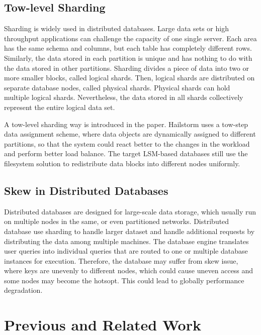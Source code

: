 \documentclass[a4paper,10pt,twoside]{article}
\begin{document}
\subsection{Tow-level Sharding}
Sharding is widely used in distributed databases. Large data sets or high throughput applications can challenge the capacity of one single server.
Each area has the same schema and columns, but each table has completely different rows. 
Similarly, the data stored in each partition is unique and has nothing to do with the data stored in other partitions.
Sharding divides a piece of data into two or more smaller blocks, called logical shards.
Then, logical shards are distributed on separate database nodes, called physical shards.
Physical shards can hold multiple logical shards. 
Nevertheless, the data stored in all shards collectively represent the entire logical data set.
\par
A tow-level sharding way is introduced in the paper\cite{mainpaper}. 
Hailstorm uses a tow-step data assignment scheme, where data objects are dynamically assigned to different partitions, 
so that the system could react better to the changes in the workload and perform better load balance.
The target LSM-based databases still use the filesystem solution to redistribute data blocks into different nodes uniformly.


\subsection{Skew in Distributed Databases}

Distributed databases \cite{mongodb,tidb} are designed for large-scale data storage, which usually run on multiple nodes in the same,
or even partitioned networks.
Distributed database use sharding to handle larger dataset and handle additional requests by distributing the data among multiple machines.
The database engine translates user queries into individual queries that are routed to one or multiple database instances for execution.
Therefore, the database may suffer from skew issue, where keys are unevenly to different nodes, which could cause uneven access and some nodes may become the hotsopt.
This could lead to globally performance degradation.



\section{Previous and Related Work}
\end{document}
